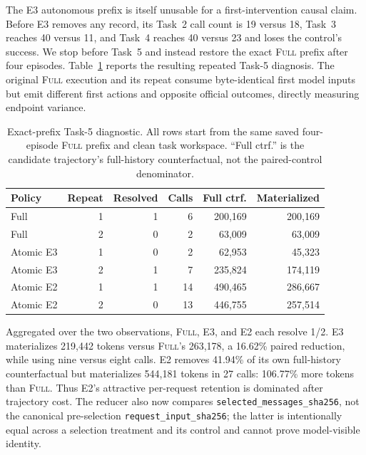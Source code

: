 \documentclass[11pt]{article}
\begin{document}
The E3 autonomous prefix is itself unusable for a first-intervention causal
claim.  Before E3 removes any record, its Task~2 call count is 19 versus 18,
Task~3 reaches 40 versus 11, and Task~4 reaches 40 versus 23 and loses the
control's success.  We stop before Task~5 and instead restore the exact
\textsc{Full} prefix after four episodes.  Table~\ref{tab:task5-exact-prefix}
reports the resulting repeated Task-5 diagnosis.  The original \textsc{Full}
execution and its repeat consume byte-identical first model inputs but emit
different first actions and opposite official outcomes, directly measuring
endpoint variance.

\begin{table}[H]
\centering
\scriptsize
\caption{Exact-prefix Task-5 diagnostic.  All rows start from the same saved
four-episode \textsc{Full} prefix and clean task workspace.  ``Full ctrf.'' is
the candidate trajectory's full-history counterfactual, not the paired-control
denominator.}
\label{tab:task5-exact-prefix}
\begin{tabular}{lrrrrr}
\toprule
Policy & Repeat & Resolved & Calls & Full ctrf. & Materialized \\
\midrule
Full & 1 & 1 & 6 & 200,169 & 200,169 \\
Full & 2 & 0 & 2 & 63,009 & 63,009 \\
Atomic E3 & 1 & 0 & 2 & 62,953 & 45,323 \\
Atomic E3 & 2 & 1 & 7 & 235,824 & 174,119 \\
Atomic E2 & 1 & 1 & 14 & 490,465 & 286,667 \\
Atomic E2 & 2 & 0 & 13 & 446,755 & 257,514 \\
\bottomrule
\end{tabular}
\end{table}

Aggregated over the two observations, \textsc{Full}, E3, and E2 each resolve
1/2.  E3 materializes 219,442 tokens versus \textsc{Full}'s 263,178, a 16.62\%
paired reduction, while using nine versus eight calls.  E2 removes 41.94\% of
its own full-history counterfactual but materializes 544,181 tokens in 27 calls:
106.77\% more tokens than \textsc{Full}.  Thus E2's attractive per-request
retention is dominated after trajectory cost.  The reducer also now compares
\texttt{selected\_messages\_sha256}, not the canonical pre-selection
\texttt{request\_input\_sha256}; the latter is intentionally equal across a
selection treatment and its control and cannot prove model-visible identity.
\end{document}
